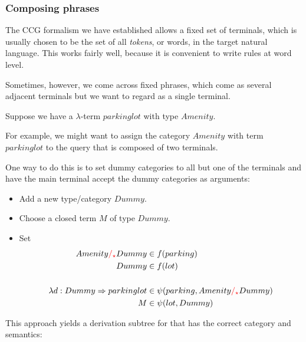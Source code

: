 \documentclass[main.tex]{subfiles}
\begin{document}
\subsubsection{Composing phrases}
The CCG formalism we have established allows a fixed set of terminals,
which is usually chosen to be the set of all \emph{tokens}, or words,
in the target natural language. This works fairly well, because it is
convenient to write rules at word level.

Sometimes, however, we come across fixed phrases, which come as several
adjacent terminals but we want to regard as a single terminal.


\begin{example}
    Suppose we have a $\lambda$-term $parkinglot$ with type $Amenity$.

    For example, we might want to assign the category $Amenity$ with term
    $parkinglot$
    to the query  that is composed of two terminals.

    One way to do this is to set dummy categories to all but one of the
    terminals and have the main terminal accept the dummy categories as
    arguments:
    \begin{itemize}
        \item Add a new type/category $Dummy$.
        \item Choose a closed term $M$ of type $Dummy$.
        \item Set
            \begin{align*}
                Amenity \textcolor{red}{/_{\star}} Dummy &\in f(parking)\\
                Dummy &\in f(lot) \\
                \\
                \lambda d: Dummy \Rightarrow parkinglot &\in \psi(parking, Amenity \textcolor{red}{/_{\star}} Dummy)  \\
                M &\in \psi(lot, Dummy) \\
            \end{align*}
    \end{itemize}
    This approach yields a derivation subtree for  that
    has the correct category and semantics:
\end{example}
\end{document}
